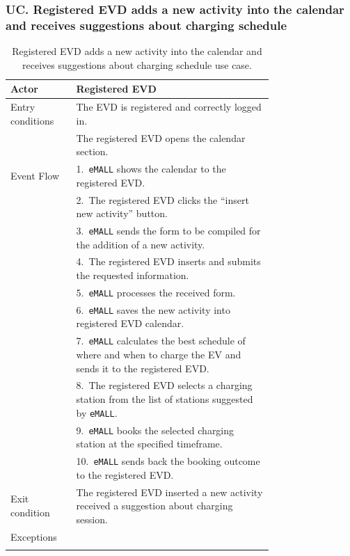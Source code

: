 \subsubsection*{UC\cuc . Registered EVD adds a new activity into the calendar and receives suggestions about charging schedule}
\begin{center}
    \begin{longtable}{lp{0.75\linewidth}}
        \hline
        Actor            & Registered EVD                                                                                                \\
        \hline
        Entry conditions & The EVD is registered and correctly logged in.                                                                \\
        & The registered EVD opens the calendar section.                                                                \\
        \hline
        Event Flow       & 1.\ \verb|eMALL| shows the calendar to the registered EVD.                                                           \\
        & 2.\ The registered EVD clicks the ``insert new activity'' button.                                             \\
        & 3.\ \verb|eMALL| sends the form to be compiled for the addition of a new activity.                                   \\
        & 4.\ The registered EVD inserts and submits the requested information.                                         \\
        & 5.\ \verb|eMALL| processes the received form.                                                                        \\
        & 6.\ \verb|eMALL| saves the new activity into registered EVD calendar.                                                \\
        & 7.\ \verb|eMALL| calculates the best schedule of where and when to charge the EV and sends it to the registered EVD. \\
        & 8.\ The registered EVD selects a charging station from the list of stations suggested by \verb|eMALL|.        \\
        & 9.\ \verb|eMALL| books the selected charging station at the specified timeframe.                                     \\
        & 10.\ \verb|eMALL| sends back the booking outcome to the registered EVD.                                              \\
        \hline
        Exit condition   & The registered EVD inserted a new activity received a suggestion about charging session.                      \\
        \hline
        Exceptions       &                                                                                                               \\
        \hline
        \caption{Registered EVD adds a new activity into the calendar and receives suggestions about charging schedule use case.}
        \label{tab: EVD_adds_activity_calendar_use_case}
    \end{longtable}


\end{center}
